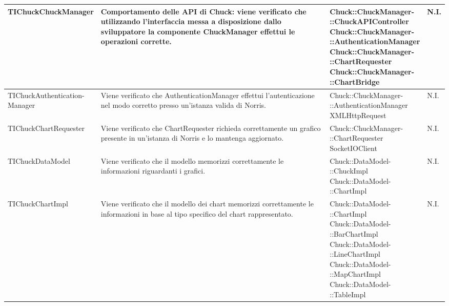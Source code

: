 \begin{longtabu}{| X | X | X[0.9] | X[0.3] |}
	TIChuckChuckManager
				&
Comportamento delle API di Chuck: viene verificato che utilizzando l'interfaccia messa a disposizione dallo sviluppatore la componente ChuckManager effettui le operazioni corrette.
			& \parbox[t]{0.6\textwidth}{
Chuck::ChuckManager-\\::ChuckAPIController\\
Chuck::ChuckManager-\\::AuthenticationManager\\
Chuck::ChuckManager-\\::ChartRequester\\
Chuck::ChuckManager-\\::ChartBridge}
			& N.I.
			\\ \hline


	
	\parbox[t]{0.6\textwidth}{TIChuckAuthentication-\\Manager}
				&
Viene verificato che AuthenticationManager effettui l'autenticazione nel modo corretto presso un'istanza valida di Norris.
			& \parbox[t]{0.6\textwidth}{
Chuck::ChuckManager-\\::AuthenticationManager\\
XMLHttpRequest}
			& N.I.
			\\ \hline



	TIChuckChartRequester
				&
Viene verificato che ChartRequester richieda correttamente un grafico presente in un'istanza di Norris e lo mantenga aggiornato.
			& \parbox[t]{0.6\textwidth}{
Chuck::ChuckManager-\\::ChartRequester\\
SocketIOClient}
			& N.I.
			\\ \hline



	TIChuckDataModel
				&
Viene verificato che il modello memorizzi correttamente le informazioni riguardanti i grafici.
			& \parbox[t]{0.6\textwidth}{
Chuck::DataModel-\\::ChuckImpl\\
Chuck::DataModel-\\::ChartImpl}
			& N.I.
			\\ \hline



	TIChuckChartImpl
				&
Viene verificato che il modello dei chart memorizzi correttamente le informazioni in base al tipo specifico del chart rappresentato.
			& \parbox[t]{0.6\textwidth}{
Chuck::DataModel-\\::ChartImpl\\
Chuck::DataModel-\\::BarChartImpl\\
Chuck::DataModel-\\::LineChartImpl\\
Chuck::DataModel-\\::MapChartImpl\\
Chuck::DataModel-\\::TableImpl}
			& N.I.
			\\ \hline




\end{longtabu}
